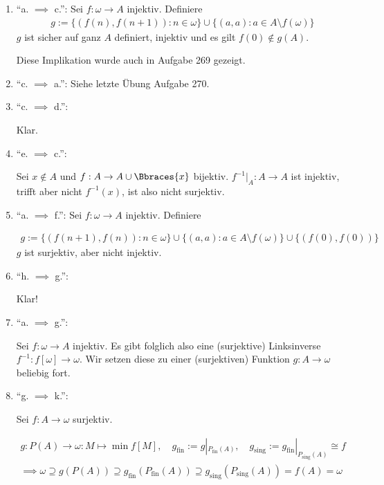\begin{solution}
\begin{enumerate}[label = \texttt{ad}]
\begin{enumerate}[label = \arabic*.]
	\end{enumerate}

	\item \enquote{a. $\implies$ c.}: Sei $f: \omega \to A$ injektiv.
	Definiere
	\begin{align*}
	g := \{(f(n),f(n+1)): n \in \omega\} \cup \{(a,a): a \in A \setminus f(\omega)\}
	\end{align*}
	$g$ ist sicher auf ganz $A$ definiert, injektiv und es gilt $f(0) \notin g(A)$.
	
	Diese Implikation wurde auch in Aufgabe 269 gezeigt.
	
	\item \enquote{c. $\implies$ a.}: Siehe letzte Übung Aufgabe 270.
	
	\item \enquote{c. $\implies$ d.}:
	
	Klar.
	
	\item \enquote{e. $\implies$ c.}:
	
	Sei $x \not \in A$ und $f: A \to A \cup \Bbraces{x}$ bijektiv.
	$f^{-1} |_A: A \to A$ ist injektiv, trifft aber nicht $f^{-1}(x)$, ist also nicht surjektiv.
	
	\item \enquote{a. $\implies$ f.}: Sei $f: \omega \to A$ injektiv. Definiere
	
	\begin{align*}
	g := \{(f(n+1),f(n)): n \in \omega\} \cup \{(a,a): a \in A \setminus f(\omega)\}
	\cup \{(f(0),f(0))\}
	\end{align*}
	$g$ ist surjektiv, aber nicht injektiv.
	
	\item \enquote{h. $\implies$ g.}:
	
	Klar!
	
	\item \enquote{a. $\implies$ g.}:
	
	Sei $f: \omega \to A$ injektiv.
	Es gibt folglich also eine (surjektive) Linksinverse $f^{-1}: f[\omega] \to \omega$.
	Wir setzen diese zu einer (surjektiven) Funktion $g: A \to \omega$ beliebig fort.
	
	\item \enquote{g. $\implies$ k.}:
	
	Sei $f: A \to \omega$ surjektiv.
	
	\begin{gather*}
	g:
	P(A) \to \omega:
	M \mapsto \min f[M],
	\quad
	g_\mathrm{fin} := g |_{P_\mathrm{fin}(A)},
	\quad
	g_\mathrm{sing} := g_\mathrm{fin} |_{P_\mathrm{sing}(A)} \cong f \\
	\implies
	\omega
	\supseteq
	g(P(A))
	\supseteq
	g_\mathrm{fin}(P_\mathrm{fin}(A))
	\supseteq
	g_\mathrm{sing}(P_\mathrm{sing}(A))
	=
	f(A)
	=
	\omega
	\end{gather*}
	

\end{enumerate}
\end{solution}
